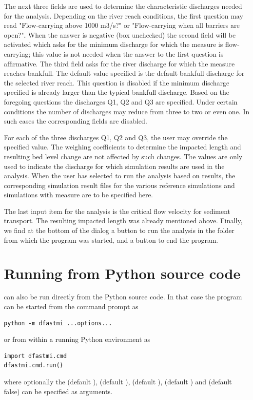 The next three fields are used to determine the characteristic discharges needed for the analysis.
Depending on the river reach conditions, the first question may read "Flow-carrying above 1000 m3/s?" or "Flow-carrying when all barriers are open?".
When the answer is negative (box unchecked) the second field will be activated which asks for the minimum discharge  for which the measure is flow-carrying; this value is not needed when the answer to the first question is affirmative.
The third field asks for the river discharge  for which the measure reaches bankfull.
The default value specified is the default bankfull discharge for the selected river reach.
This question is disabled if the minimum discharge specified is already larger than the typical bankfull discharge.
Based on the foregoing questions the discharges Q1, Q2 and Q3 are specified.
Under certain conditions the number of discharges may reduce from three to two or even one.
In such cases the corresponding fields are disabled.

For each of the three discharges Q1, Q2 and Q3, the user may override the specified value.
The weighing coefficients to determine the impacted length and resulting bed level change are not affected by such changes.
The values are only used to indicate the discharge for which simulation results are used in the analysis.
When the user has selected to run the analysis based on \dflowfm results, the corresponding simulation result files for the various reference simulations and simulations with measure are to be specified here.

The last input item for the analysis is the critical flow velocity  for sediment transport.
The resulting impacted length  was already mentioned above.
Finally, we find at the bottom of the dialog a button to run the analysis in the folder from which the program was started, and a button to end the program.

\section{Running from Python source code}
\dfastmi can also be run directly from the Python source code.
In that case the program can be started from the command prompt as

\begin{Verbatim}
python -m dfastmi ...options...
\end{Verbatim}

or from within a running Python environment as

\begin{Verbatim}
import dfastmi.cmd
dfastmi.cmd.run()
\end{Verbatim}

where optionally the  (default ),  (default ),  (default ),  (default ) and  (default false) can be specified as arguments.